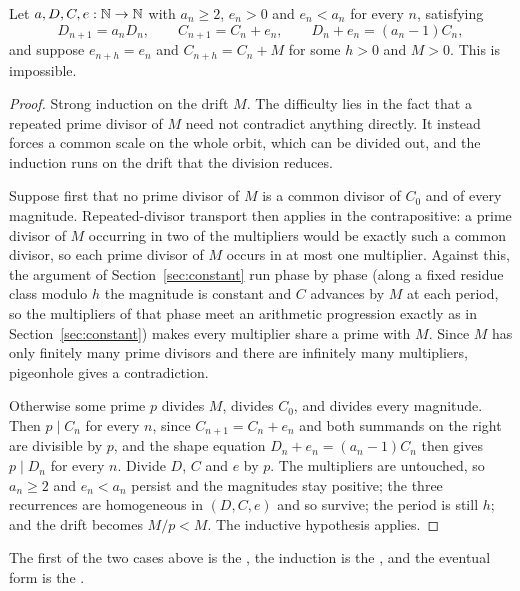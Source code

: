\documentclass[11pt]{article}
\begin{document}
\begin{theorem}\label{res:periodic}
Let $a,D,C,e:\mathbb{N}\to\mathbb{N}$ with $a_n\ge2$, $e_n>0$ and $e_n<a_n$ for every $n$,
satisfying
\[
 D_{n+1}=a_nD_n,\qquad C_{n+1}=C_n+e_n,\qquad D_n+e_n=(a_n-1)C_n ,
\]
and suppose $e_{n+h}=e_n$ and $C_{n+h}=C_n+M$ for some $h>0$ and $M>0$.  This
is impossible.
\end{theorem}

\begin{proof}
Strong induction on the drift $M$.  The difficulty lies in the fact that a
repeated prime divisor of $M$ need not contradict anything directly.  It
instead forces a common scale on the whole orbit, which can be divided out, and
the induction runs on the drift that the division reduces.

Suppose first that no prime divisor of $M$ is a common divisor of $C_0$ and of
every magnitude.  Repeated-divisor transport then applies in the
contrapositive: a prime divisor of $M$ occurring in two of the multipliers
would be exactly such a common divisor, so each prime divisor of $M$ occurs in
at most one multiplier.  Against this, the argument of
Section~\ref{sec:constant} run phase by phase (along a fixed residue class
modulo $h$ the magnitude is constant and $C$ advances by $M$ at each period, so
the multipliers of that phase meet an arithmetic progression exactly as in
Section~\ref{sec:constant}) makes every multiplier share a prime with $M$.
Since $M$ has only finitely many prime divisors and there are infinitely many
multipliers, pigeonhole gives a contradiction.

Otherwise some prime $p$ divides $M$, divides $C_0$, and divides every
magnitude.  Then $p\mid C_n$ for every $n$, since $C_{n+1}=C_n+e_n$ and both
summands on the right are divisible by $p$, and the shape equation
$D_n+e_n=(a_n-1)C_n$ then gives $p\mid D_n$ for every $n$.  Divide $D$, $C$ and
$e$ by $p$.  The multipliers are untouched, so $a_n\ge2$ and $e_n<a_n$ persist
and the magnitudes stay positive; the three recurrences are homogeneous in
$(D,C,e)$ and so survive; the period is still $h$; and the drift becomes
$M/p<M$.  The inductive hypothesis applies.
\end{proof}

\noindent The first of the two cases above is the
, the induction is the
, and the eventual form is the
.
\end{document}
